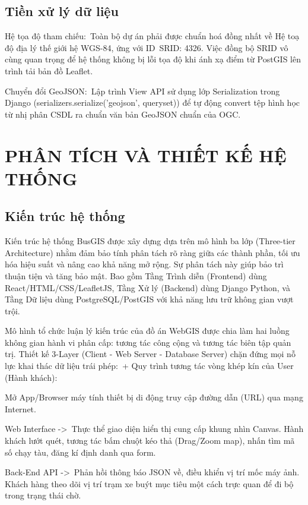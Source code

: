 \documentclass[13pt,a4paper]{report}
\begin{document}
\section{Tiền xử lý dữ liệu}

Hệ tọa độ tham chiếu: Toàn bộ dự án phải được chuẩn hoá đồng nhất về Hệ toạ độ địa lý thế giới hệ WGS-84, ứng với ID SRID: 4326. Việc đồng bộ SRID vô cùng quan trọng để hệ thống không bị lỗi tọa độ khi ánh xạ điểm từ PostGIS lên trình tải bản đồ Leaflet.

Chuyển đổi GeoJSON: Lập trình View API sử dụng lớp Serialization trong Django (serializers.serialize('geojson', queryset)) để tự động convert tệp hình học từ nhị phân CSDL ra chuẩn văn bản GeoJSON chuẩn của OGC.

\chapter{PHÂN TÍCH VÀ THIẾT KẾ HỆ THỐNG}

\section{Kiến trúc hệ thống}

Kiến trúc hệ thống BusGIS được xây dựng dựa trên mô hình ba lớp (Three-tier Architecture) nhằm đảm bảo tính phân tách rõ ràng giữa các thành phần, tối ưu hóa hiệu suất và nâng cao khả năng mở rộng. Sự phân tách này giúp bảo trì thuận tiện và tăng bảo mật. Bao gồm Tầng Trình diễn (Frontend) dùng React/HTML/CSS/LeafletJS, Tầng Xử lý (Backend) dùng Django Python, và Tầng Dữ liệu dùng PostgreSQL/PostGIS với khả năng lưu trữ không gian vượt trội.

Mô hình tổ chức luận lý kiến trúc của đồ án WebGIS được chia làm hai luồng không gian hành vi phân cấp: tương tác công cộng và tương tác biên tập quản trị. Thiết kế 3-Layer (Client - Web Server - Database Server) chặn đứng mọi nỗ lực khai thác dữ liệu trái phép: + Quy trình tương tác vòng khép kín của User (Hành khách):

Mở App/Browser máy tính thiết bị di động truy cập đường dẫn (URL) qua mạng Internet.

Web Interface -> Thực thể giao diện hiển thị cung cấp khung nhìn Canvas. Hành khách lướt quét, tương tác bấm chuột kéo thả (Drag/Zoom map), nhấn tìm mã số chạy tàu, đăng kí định danh qua form.

Back-End API -> Phản hồi thông báo JSON về, điều khiển vị trí mốc máy ảnh. Khách hàng theo dõi vị trí trạm xe buýt mục tiêu một cách trực quan để đi bộ trong trạng thái chờ.
\end{document}
